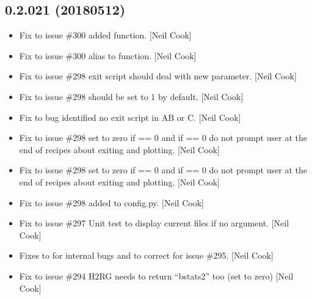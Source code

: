 \documentclass[a4paper,10pt,english]{report}
\begin{document}
\subsection{0.2.021 (2018\sphinxhyphen{}05\sphinxhyphen{}12)}
\label{\detokenize{misc/changelog:id459}}\begin{itemize}
\item {} 
Fix to issue \#300 \sphinxhyphen{} added  function. {[}Neil Cook{]}

\item {} 
Fix to issue \#300 \sphinxhyphen{} alias to  function. {[}Neil Cook{]}

\item {} 
Fix to issue \#298 \sphinxhyphen{} exit script should deal with new 
parameter. {[}Neil Cook{]}

\item {} 
Fix to issue \#298 \sphinxhyphen{}  should be set to 1 by default.
{[}Neil Cook{]}

\item {} 
Fix to bug identified \sphinxhyphen{} no exit script in AB or C. {[}Neil Cook{]}

\item {} 
Fix to issue \#298 \sphinxhyphen{} set  to zero if  == 0 and
if  == 0 do not prompt user at the end of recipes about
exiting and plotting. {[}Neil Cook{]}

\item {} 
Fix to issue \#298 \sphinxhyphen{} set  to zero if  == 0 and
if  == 0 do not prompt user at the end of recipes about
exiting and plotting. {[}Neil Cook{]}

\item {} 
Fix to issue \#298 \sphinxhyphen{} added  to config.py. {[}Neil Cook{]}

\item {} 
Fix to issue \#297 \sphinxhyphen{} Unit test to display current files if no argument.
{[}Neil Cook{]}

\item {} 
Fixes to  for internal bugs and to correct for issue \#295.
{[}Neil Cook{]}

\item {} 
Fix to issue \#294 \sphinxhyphen{} H2RG needs to return “bstats2” too (set to zero)
{[}Neil Cook{]}


\end{itemize}
\end{document}
